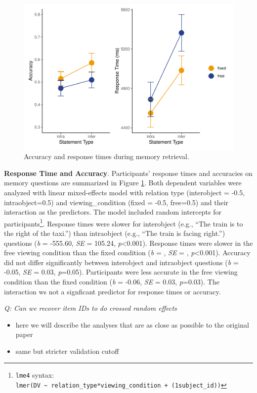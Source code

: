 \documentclass[
  english,
  man,floatsintext]{apa6}
\begin{document}
\begin{figure}
\centering
\includegraphics{manuscript_files/figure-latex/E2-rt-acc-fig-1.pdf}
\caption{\label{fig:E2-rt-acc-fig}Accuracy and response times during memory retrieval.}
\end{figure}

\textbf{Response Time and Accuracy}. Participants' response times and accuracies on memory questions are summarized in Figure \ref{fig:E2-rt-acc-fig}. Both dependent variables were analyzed with linear mixed-effects model with relation type (interobject = -0.5, intraobject=0.5) and viewing\_condition (fixed = -0.5, free=0.5) and their interaction as the predictors. The model included random intercepts for participants\footnote{ \texttt{lme4} syntax: \texttt{lmer(DV\ \textasciitilde{}\ relation\_type*viewing\_condition\ +\ (1\textbar{}subject\_id))}}. Response times were slower for interobject (e.g., ``The train is to the right of the taxi.'') than intraobject (e.g., ``The train is facing right.'') questions (\emph{b} = -555.60, \emph{SE} = 105.24, \emph{p}\textless0.001). Response times were slower in the free viewing condition than the fixed condition (\emph{b} = , \emph{SE} = , \emph{p}\textless0.001). Accuracy did not differ significantly between interobject and intraobject questions (\emph{b} = -0.05, \emph{SE} = 0.03, \emph{p}=0.05). Participants were less accurate in the free viewing condition than the fixed condition (\emph{b} = -0.06, \emph{SE} = 0.03, \emph{p}=0.03). The interaction ws not a signficant predictor for response times or accuracy.

\emph{Q: Can we recover item IDs to do crossed random effects}

\begin{itemize}
\item
  here we will describe the analyses that are as close as possible to the original paper
\item
  same but stricter validation cutoff
\end{itemize}
\end{document}
